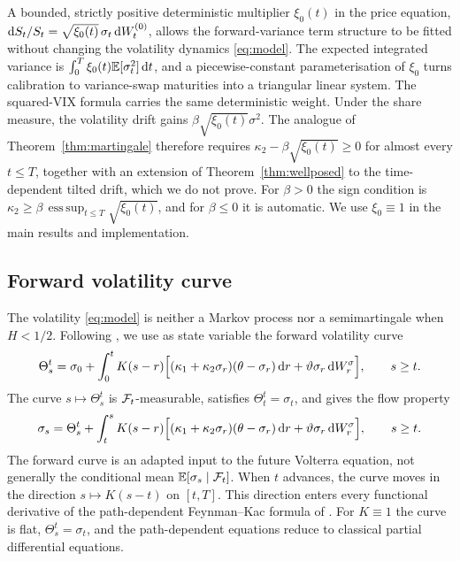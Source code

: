 \begin{remark}\label{rem:xi}
A bounded, strictly positive deterministic multiplier $\xi_0(t)$ in the price equation, $\mathrm{d} S_t/S_t=\sqrt{\xi_0(t)}\,\sigma_t\,\mathrm{d} W^{(0)}_t$, allows the forward-variance term structure to be fitted without changing the volatility dynamics \eqref{eq:model}. The expected integrated variance is $\int_0^T\xi_0(t)\mathbb{E}[\sigma_t^2]\,\mathrm{d} t$, and a piecewise-constant parameterisation of $\xi_0$ turns calibration to variance-swap maturities into a triangular linear system. The squared-VIX formula carries the same deterministic weight. Under the share measure, the volatility drift gains $\beta\sqrt{\xi_0(t)}\sigma^2$. The analogue of Theorem~\ref{thm:martingale} therefore requires $\kappa_2-\beta\sqrt{\xi_0(t)}\ge0$ for almost every $t\le T$, together with an extension of Theorem~\ref{thm:wellposed} to the time-dependent tilted drift, which we do not prove. For $\beta>0$ the sign condition is $\kappa_2\ge\beta\,\operatorname*{ess\,sup}_{t\le T}\sqrt{\xi_0(t)}$, and for $\beta\le0$ it is automatic. We use $\xi_0\equiv1$ in the main results and implementation.
\end{remark}

\subsection{Forward volatility curve}

The volatility \eqref{eq:model} is neither a Markov process nor a semimartingale when $H<1/2$. Following \citet{ViensZhang2019}, we use as state variable the forward volatility curve
\begin{equation}\label{eq:theta_curve}
\Theta^t_s=\sigma_0+\int_0^t K(s-r)\Big[(\kappa_1+\kappa_2\sigma_r)(\theta-\sigma_r)\,\D r+\vartheta\sigma_r\,\D W^\sigma_r\Big],\qquad s\ge t .
\end{equation}
The curve $s\mapsto\Theta^t_s$ is $\mathcal{F}_t$-measurable, satisfies $\Theta^t_t=\sigma_t$, and gives the flow property
\begin{equation}\label{eq:flow}
\sigma_s=\Theta^t_s+\int_t^s K(s-r)\Big[(\kappa_1+\kappa_2\sigma_r)(\theta-\sigma_r)\,\D r+\vartheta\sigma_r\,\D W^\sigma_r\Big],\qquad s\ge t .
\end{equation}
The forward curve is an adapted input to the future Volterra equation, not generally the conditional mean $\mathbb{E}[\sigma_s\mid\mathcal{F}_t]$. When $t$ advances, the curve moves in the direction $s\mapsto K(s-t)$ on $[t,T]$. This direction enters every functional derivative of the path-dependent Feynman--Kac formula of \citet{ViensZhang2019}. For $K\equiv1$ the curve is flat, $\Theta^t_s=\sigma_t$, and the path-dependent equations reduce to classical partial differential equations.

